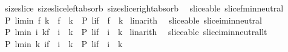 \begin{isabellebody}
\ \ size{\isacharunderscore}slice\ size{\isacharunderscore}slice{\isacharunderscore}left{\isacharunderscore}absorb\ size{\isacharunderscore}slice{\isacharunderscore}right{\isacharunderscore}absorb\isanewline
\isanewline
{}\isamarkupfalse%
\ {\isacharparenleft}\ sliceable{\isacharparenright}\ slice{\isacharunderscore}f{\isacharunderscore}min{\isacharunderscore}neutral{\isacharcolon}\ \isanewline
\ \ {\isachardoublequoteopen}{\isacharparenleft}P\ {\isacharparenleft}l{\isasymdagger}i{\isachardot}{\isachardot}{\isacharparenleft}min\ f\ k{\isacharparenright}{\isacharparenright}\ {\isasymand}\ f\ {\isasymle}\ k{\isacharparenright}\ {\isasymlongleftrightarrow}\ {\isacharparenleft}P\ {\isacharparenleft}l{\isasymdagger}i{\isachardot}{\isachardot}f{\isacharparenright}\ {\isasymand}\ f\ {\isasymle}\ k{\isacharparenright}{\isachardoublequoteclose}\isanewline
%
\isadelimproof
%
\endisadelimproof
%
\isatagproof
{}\isamarkupfalse%
\ linarith%
\endisatagproof
{\isafoldproof}%
%
\isadelimproof
\isanewline
%
\endisadelimproof
\isanewline
{}\isamarkupfalse%
\ {\isacharparenleft}\ sliceable{\isacharparenright}\ slice{\isacharunderscore}i{\isacharunderscore}min{\isacharunderscore}neutral{\isacharcolon}\ \isanewline
\ \ {\isachardoublequoteopen}{\isacharparenleft}P\ {\isacharparenleft}l{\isasymdagger}{\isacharparenleft}min\ i\ k{\isacharparenright}{\isachardot}{\isachardot}f{\isacharparenright}\ {\isasymand}\ i\ {\isasymle}\ k{\isacharparenright}\ {\isasymlongleftrightarrow}\ {\isacharparenleft}P\ {\isacharparenleft}l{\isasymdagger}i{\isachardot}{\isachardot}f{\isacharparenright}\ {\isasymand}\ i\ {\isasymle}\ k{\isacharparenright}{\isachardoublequoteclose}\isanewline
%
\isadelimproof
%
\endisadelimproof
%
\isatagproof
{}\isamarkupfalse%
\ linarith%
\endisatagproof
{\isafoldproof}%
%
\isadelimproof
\isanewline
%
\endisadelimproof
\isanewline
{}\isamarkupfalse%
\ {\isacharparenleft}\ sliceable{\isacharparenright}\ slice{\isacharunderscore}i{\isacharunderscore}min{\isacharunderscore}neutral{\isacharunderscore}lt{\isacharcolon}\ \isanewline
\ \ {\isachardoublequoteopen}{\isacharparenleft}P\ {\isacharparenleft}l{\isasymdagger}{\isacharparenleft}min\ k\ i{\isacharparenright}{\isachardot}{\isachardot}f{\isacharparenright}\ {\isasymand}\ i\ {\isacharless}\ k{\isacharparenright}\ {\isasymlongleftrightarrow}\ {\isacharparenleft}P\ {\isacharparenleft}l{\isasymdagger}i{\isachardot}{\isachardot}f{\isacharparenright}\ {\isasymand}\ i\ {\isacharless}\ k{\isacharparenright}{\isachardoublequoteclose}\isanewline

\end{isabellebody}
